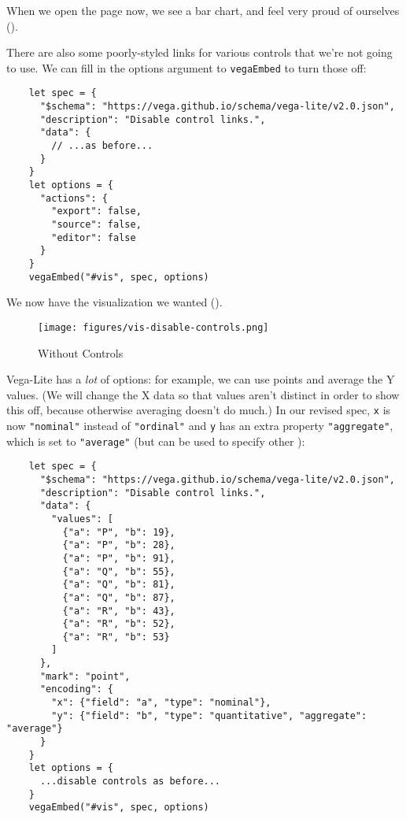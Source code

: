 When we open the page now,
we see a bar chart,
and feel very proud of ourselves
().


There are also some poorly-styled links for various controls that we're not going to use.
We can fill in the options argument to \texttt{vegaEmbed} to turn those off:

\begin{verbatim}
    let spec = {
      "$schema": "https://vega.github.io/schema/vega-lite/v2.0.json",
      "description": "Disable control links.",
      "data": {
        // ...as before...
      }
    }
    let options = {
      "actions": {
        "export": false,
        "source": false,
        "editor": false
      }
    }
    vegaEmbed("#vis", spec, options)
\end{verbatim}

We now have the visualization we wanted
().

\begin{figure}
\centering
\texttt{[image: figures/vis-disable-controls.png]}
\caption{Without Controls}
\label{f:vis-disable-controls}
\end{figure}

Vega-Lite has a \emph{lot} of options:
for example,
we can use points and average the Y values.
(We will change the X data so that values aren't distinct in order to show this off,
because otherwise averaging doesn't do much.)
In our revised spec,
\texttt{x} is now \texttt{"nominal"} instead of \texttt{"ordinal"}
and \texttt{y} has an extra property \texttt{"aggregate"},
which is set to \texttt{"average"}
(but can be used to specify other ):

\begin{verbatim}
    let spec = {
      "$schema": "https://vega.github.io/schema/vega-lite/v2.0.json",
      "description": "Disable control links.",
      "data": {
        "values": [
          {"a": "P", "b": 19},
          {"a": "P", "b": 28},
          {"a": "P", "b": 91},
          {"a": "Q", "b": 55},
          {"a": "Q", "b": 81},
          {"a": "Q", "b": 87},
          {"a": "R", "b": 43},
          {"a": "R", "b": 52},
          {"a": "R", "b": 53}
        ]
      },
      "mark": "point",
      "encoding": {
        "x": {"field": "a", "type": "nominal"},
        "y": {"field": "b", "type": "quantitative", "aggregate": "average"}
      }
    }
    let options = {
      ...disable controls as before...
    }
    vegaEmbed("#vis", spec, options)
\end{verbatim}

